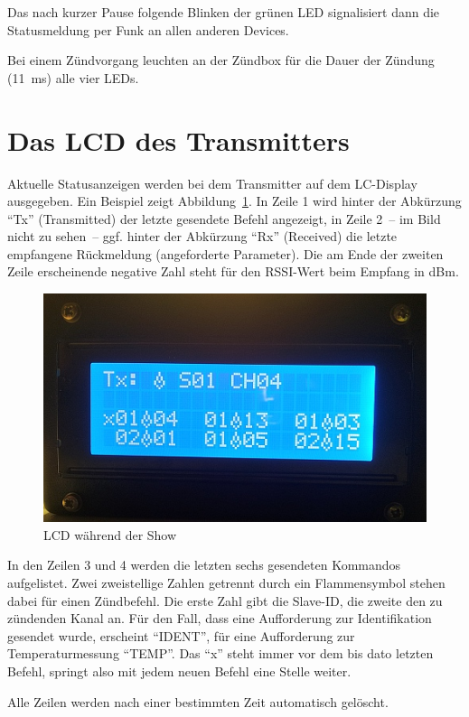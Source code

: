 \documentclass[paper=a4, parskip, numbers=noenddot, toc=listof, headsepline]{scrbook}
\begin{document}
			Das nach kurzer Pause folgende Blinken der grünen LED signalisiert dann die Statusmeldung per Funk an allen anderen Devices.

			Bei einem Zündvorgang leuchten an der Zündbox für die Dauer der Zündung (\SI{11}{\milli\second}) alle vier LEDs.

		\section{Das LCD des Transmitters}

			Aktuelle Statusanzeigen werden bei dem Transmitter auf dem LC-Display ausgegeben. Ein Beispiel zeigt Abbildung~\ref{fig:senderanzeige}. In Zeile 1 wird hinter der Abkürzung \enquote{Tx} (Transmitted) der letzte gesendete Befehl angezeigt, in Zeile 2~-- im Bild nicht zu sehen~-- ggf. hinter der Abkürzung \enquote{Rx} (Received) die letzte empfangene Rückmeldung (angeforderte Parameter). Die am Ende der zweiten Zeile erscheinende negative Zahl steht für den RSSI-Wert beim Empfang in dBm.

			\begin{figure}
				\centering
				\includegraphics[width=.7\textwidth]{Bilder/SenderAnzeige}
				\caption{LCD während der Show}
				\label{fig:senderanzeige}
			\end{figure}

			In den Zeilen 3 und 4 werden die letzten sechs gesendeten Kommandos aufgelistet. Zwei zweistellige Zahlen getrennt durch ein Flammensymbol stehen dabei für einen Zündbefehl. Die erste Zahl gibt die Slave-ID, die zweite den zu zündenden Kanal an. Für den Fall, dass eine Aufforderung zur Identifikation gesendet wurde, erscheint \enquote{IDENT}, für eine Aufforderung zur Temperaturmessung \enquote{TEMP}. Das \enquote{x} steht immer vor dem bis dato letzten Befehl, springt also mit jedem neuen Befehl eine Stelle weiter.

			Alle Zeilen werden nach einer bestimmten Zeit automatisch gelöscht.
\end{document}
